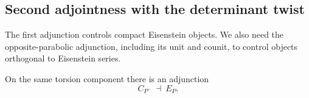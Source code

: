 \subsection{Second adjointness with the determinant twist}

The first adjunction controls compact Eisenstein objects.  We also need the
opposite-parabolic adjunction, including its unit and counit, to control
objects orthogonal to Eisenstein series.

\begin{proposition}\label{pseudo:second-adjunction}
On the same torsion component there is an adjunction
\begin{equation}\label{eq:M3}
 C_{P^-}\ \dashv\ E_P.
\end{equation}
\end{proposition}

